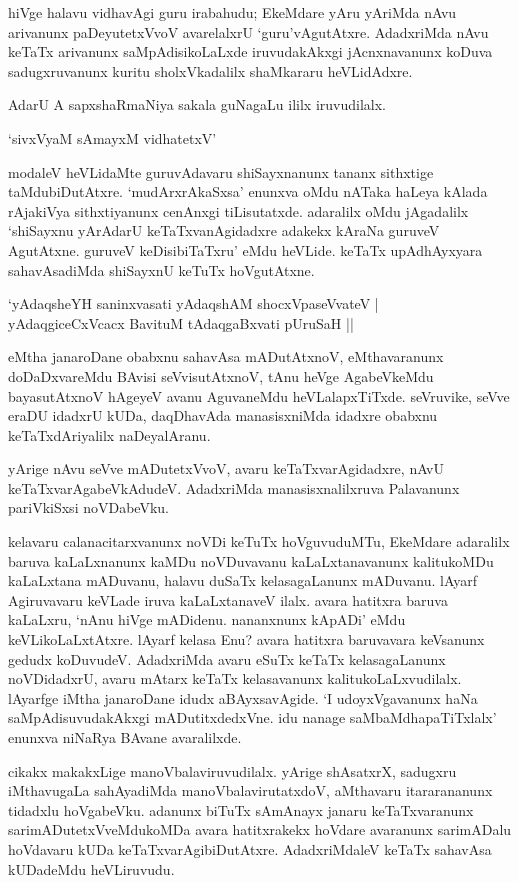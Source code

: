 hiVge halavu vidhavAgi guru irabahudu; EkeMdare yAru yAriMda nAvu arivanunx paDeyutetxVvoV avarelalxrU `guru'vAgutAtxre. AdadxriMda nAvu keTaTx arivanunx saMpAdisikoLaLxde iruvudakAkxgi jAcnxnavanunx koDuva sadugxruvanunx kuritu sholxVkadalilx shaMkararu heVLidAdxre.

AdarU A sapxshaRmaNiya sakala guNagaLu ililx iruvudilalx. 


\begin{shloka}
`sivxVyaM sAmayxM vidhatetxV'
\end{shloka}

modaleV heVLidaMte guruvAdavaru shiSayxnanunx tananx sithxtige taMdubiDutAtxre. `mudArxrAkaSxsa' enunxva oMdu nATaka haLeya kAlada rAjakiVya sithxtiyanunx cenAnxgi tiLisutatxde. adaralilx oMdu jAgadalilx `shiSayxnu yArAdarU keTaTxvanAgidadxre adakekx kAraNa guruveV AgutAtxne. guruveV keDisibiTaTxru' eMdu heVLide. keTaTx upAdhAyxyara sahavAsadiMda shiSayxnU keTuTx hoVgutAtxne.

\begin{shloka}
`yAdaqsheYH saninxvasati yAdaqshAM shocxVpaseVvateV |\\
yAdaqgiceCxVcacx BavituM tAdaqgaBxvati pUruSaH ||
\end{shloka}

eMtha janaroDane obabxnu sahavAsa mADutAtxnoV, eMthavaranunx doDaDxvareMdu BAvisi seVvisutAtxnoV, tAnu heVge AgabeVkeMdu bayasutAtxnoV hAgeyeV avanu AguvaneMdu heVLalapxTiTxde. seVruvike, seVve eraDU idadxrU kUDa, daqDhavAda manasisxniMda idadxre obabxnu keTaTxdAriyalilx naDeyalAranu. 

yArige nAvu seVve mADutetxVvoV, avaru keTaTxvarAgidadxre, nAvU keTaTxvarAgabeVkAdudeV. AdadxriMda manasisxnalilxruva Palavanunx pariVkiSxsi noVDabeVku.

kelavaru calanacitarxvanunx noVDi keTuTx hoVguvuduMTu, EkeMdare adaralilx baruva kaLaLxnanunx kaMDu noVDuvavanu kaLaLxtanavanunx kalitukoMDu kaLaLxtana mADuvanu, halavu duSaTx kelasagaLanunx mADuvanu. lAyarf Agiruvavaru keVLade iruva kaLaLxtanaveV ilalx. avara hatitxra baruva kaLaLxru, `nAnu hiVge mADidenu. nananxnunx kApADi' eMdu keVLikoLaLxtAtxre. lAyarf kelasa Enu? avara hatitxra baruvavara keVsanunx gedudx koDuvudeV. AdadxriMda avaru eSuTx keTaTx kelasagaLanunx noVDidadxrU, avaru mAtarx keTaTx kelasavanunx kalitukoLaLxvudilalx. lAyarfge iMtha janaroDane idudx aBAyxsavAgide. `I udoyxVgavanunx haNa saMpAdisuvudakAkxgi mADutitxdedxVne. idu nanage saMbaMdhapaTiTxlalx' enunxva niNaRya BAvane avaralilxde. 

cikakx makakxLige manoVbalaviruvudilalx. yArige shAsatxrX, sadugxru iMthavugaLa sahAyadiMda manoVbalavirutatxdoV, aMthavaru itararananunx tidadxlu hoVgabeVku. adanunx biTuTx sAmAnayx janaru keTaTxvaranunx sarimADutetxVveMdukoMDa avara hatitxrakekx hoVdare avaranunx sarimADalu hoVdavaru kUDa keTaTxvarAgibiDutAtxre. AdadxriMdaleV keTaTx sahavAsa kUDadeMdu heVLiruvudu.

